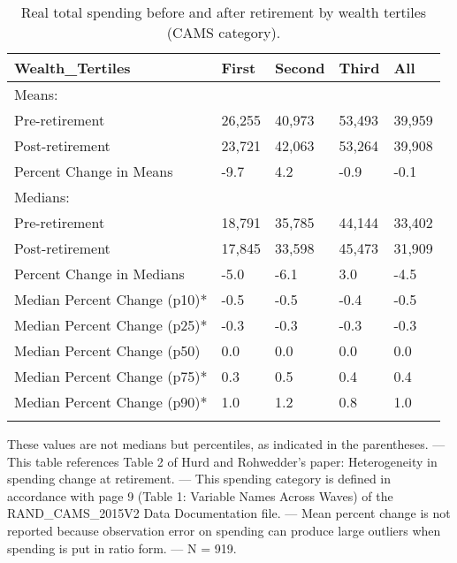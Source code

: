 \begin{table}[tbp] \centering
{}

\caption{Real total spending before and after retirement by wealth tertiles (CAMS category).}
\begin{tabularx}{\textwidth}{lCCCC}

\toprule
{Wealth\_Tertiles}&{First}&{Second}&{Third}&{All} \tabularnewline
\midrule\addlinespace[1.5ex]
Means:&&&& \tabularnewline
\midrule Pre-retirement&26,255&40,973&53,493&39,959 \tabularnewline
Post-retirement&23,721&42,063&53,264&39,908 \tabularnewline
Percent Change in Means&-9.7&4.2&-0.9&-0.1 \tabularnewline
\midrule Medians:&&&& \tabularnewline
\midrule Pre-retirement&18,791&35,785&44,144&33,402 \tabularnewline
Post-retirement&17,845&33,598&45,473&31,909 \tabularnewline
Percent Change in Medians&-5.0&-6.1&3.0&-4.5 \tabularnewline
Median Percent Change (p10)*&-0.5&-0.5&-0.4&-0.5 \tabularnewline
Median Percent Change (p25)*&-0.3&-0.3&-0.3&-0.3 \tabularnewline
Median Percent Change (p50)&0.0&0.0&0.0&0.0 \tabularnewline
Median Percent Change (p75)*&0.3&0.5&0.4&0.4 \tabularnewline
Median Percent Change (p90)*&1.0&1.2&0.8&1.0 \tabularnewline
\bottomrule \addlinespace[1.5ex]

\end{tabularx}
\begin{flushleft}
\footnotesize *These values are not medians but percentiles, as indicated in the parentheses. \linebreak --- \linebreak This table references Table 2 of Hurd and Rohwedder's paper: Heterogeneity in spending change at retirement. \linebreak --- \linebreak This spending category is defined in accordance with page 9 (Table 1: Variable Names Across Waves) of the RAND\_CAMS\_2015V2 Data Documentation file. \linebreak --- \linebreak Mean percent change is not reported because observation error on spending can produce large outliers when spending is put in ratio form. \linebreak --- \linebreak N = 919.
\end{flushleft}
\end{table}
